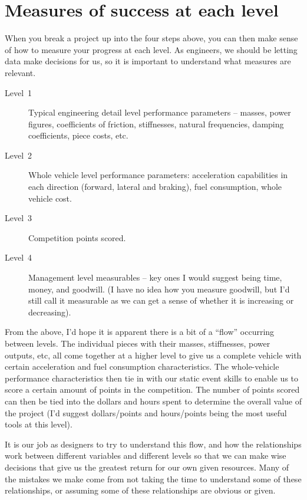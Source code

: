 \documentclass[10pt, a4paper, article, oneside, twocolumn, final]{memoir}
\begin{document}
\section*{Measures of success at each level}

When you break a project up into the four steps above, you can then make sense of how to measure your progress at each level. As engineers, we should be letting data make decisions for us, so it is important to understand what measures are relevant. 

\begin{description}
    \item[Level~1] Typical engineering detail level performance parameters -- masses, power figures, coefficients of friction, stiffnesses, natural frequencies, damping coefficients, piece costs, etc.
    \item[Level~2] Whole vehicle level performance parameters: acceleration capabilities in each direction (forward, lateral and braking), fuel consumption, whole vehicle cost.
    \item[Level~3] Competition points scored.
    \item[Level~4] Management level measurables -- key ones I would suggest being time, money, and goodwill. (I have no idea how you measure goodwill, but I’d still call it measurable as we can get a sense of whether it is increasing or decreasing). 
\end{description}

From the above, I’d hope it is apparent there is a bit of a “flow” occurring between levels. The individual pieces with their masses, stiffnesses, power outputs, etc, all come together at a higher level to give us a complete vehicle with certain acceleration and fuel consumption characteristics. The whole-vehicle performance characteristics then tie in with our static event skills to enable us to score a certain amount of points in the competition. The number of points scored can then be tied into the dollars and hours spent to determine the overall value of the project (I’d suggest dollars/\allowbreak points and hours/\allowbreak points being the most useful tools at this level). 

It is our job as designers to try to understand this flow, and how the relationships work between different variables and different levels so that we can make wise decisions that give us the greatest return for our own given resources. Many of the mistakes we make come from not taking the time to understand some of these relationships, or assuming some of these relationships are obvious or given. 
\end{document}
